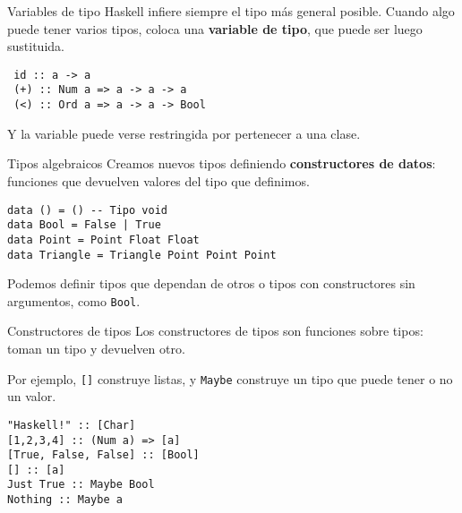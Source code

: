 \begin{frame}[fragile]{Variables de tipo}
  Haskell infiere siempre el tipo más general posible. Cuando
  algo puede tener varios tipos, coloca una \textbf{variable
  de tipo}, que puede ser luego sustituida.
  \begin{lstlisting}
 id :: a -> a
 (+) :: Num a => a -> a -> a
 (<) :: Ord a => a -> a -> Bool
  \end{lstlisting}
  
  Y la variable puede verse restringida por pertenecer a una clase.
  
\end{frame}

\begin{frame}[fragile]{Tipos algebraicos}
  Creamos nuevos tipos definiendo \textbf{constructores de datos}: funciones que
  devuelven valores del tipo que definimos. %

  \espacio

  \begin{lstlisting}
data () = () -- Tipo void
data Bool = False | True
data Point = Point Float Float
data Triangle = Triangle Point Point Point
  \end{lstlisting}

  \espacio

  Podemos definir tipos que dependan de otros
  o tipos con constructores sin argumentos, como \texttt{Bool}.
\end{frame}

\begin{frame}[fragile]{Constructores de tipos}
  Los constructores de tipos son funciones sobre tipos: toman un tipo y devuelven otro.

  \espacio

  Por ejemplo, \texttt{[]} construye listas, y \texttt{Maybe} construye un tipo
  que puede tener o no un valor.

  \begin{lstlisting}
"Haskell!" :: [Char]
[1,2,3,4] :: (Num a) => [a]
[True, False, False] :: [Bool]
[] :: [a]
Just True :: Maybe Bool
Nothing :: Maybe a
  \end{lstlisting}
\end{frame}

